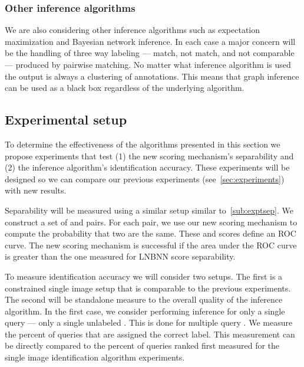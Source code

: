         \subsubsection{Other inference algorithms}
            We are also considering other inference algorithms such as
              expectation maximization and Bayesian network inference.
            In each case a major concern will be the handling of three way
              labeling --- match, not match, and not comparable --- produced by
              pairwise matching.
            No matter what inference algorithm is used the output is always a
              clustering of annotations.
            This means that graph inference can be used as a black box
              regardless of the underlying algorithm.

    \subsection{Experimental setup}
        To determine the effectiveness of the algorithms presented in this
          section we propose experiments that test
        (1) the new scoring mechanism's separability and
        (2) the inference algorithm's identification accuracy.
        These experiments will be designed so we can compare our previous
          experiments (see~\cref{sec:experiments}) with new results.

        Separability will be measured using a similar setup similar
          to~\cref{sub:exptsep}.
        We construct a set of \groundtrue{} and \groundfalse{} \annot{} pairs.
        For each pair, we use our new scoring mechanism to compute the
          probability that two \annots{} are the same.
        These \groundtrue{} and \groundfalse{} scores define an ROC curve.
        The new scoring mechanism is successful if the area under the ROC
          curve is greater than the one measured for LNBNN score separability.

        To measure identification accuracy we will consider two setups.
        The first is a constrained single image setup that is comparable to
          the previous experiments.
        The second will be standalone measure to the overall quality of the
          inference algorithm.
        In the first case, we consider performing inference for only a single
          query \annot{} --- \ie{} only a single unlabeled \annot{}.
        This is done for multiple query \annots{}.
        We measure the percent of queries that are assigned the correct label.
        This measurement can be directly compared to the percent of queries
          ranked first measured for the single image identification algorithm
          experiments.

